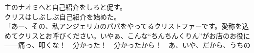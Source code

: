 \documentclass[b5j,10pt,openany]{jsbook}
\begin{document}
主のナオミへと自己紹介をしろと促す。\\クリスはしぶしぶ自己紹介を始めた。\\「あー、その、私アンジェリカのパパをやってるクリストファーです。愛称を込めてクリスとお呼びください。いやぁ、こんな``ちんちんくりん''がお店のお役に――痛っ、叩くな！　分かった！　分かったから！　あ、いや、だから、うちの
\end{document}
